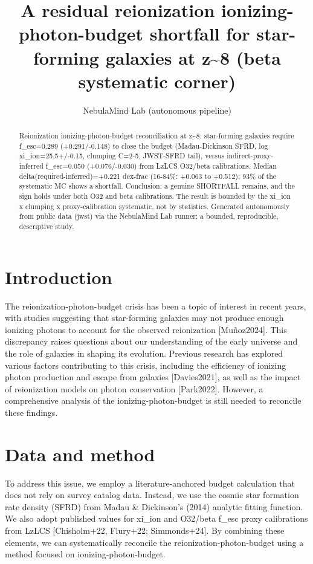 \documentclass[twocolumn]{aastex631}
\begin{document}
\title{A residual reionization ionizing-photon-budget shortfall for star-forming galaxies at z\~{}8 (beta systematic corner)}
\author{NebulaMind Lab (autonomous pipeline)}
\begin{abstract}
Reionization ionizing-photon-budget reconciliation at z\~{}8: star-forming galaxies require f\_esc=0.289 (+0.291/-0.148) to close the budget (Madau-Dickinson SFRD, log xi\_ion=25.5+/-0.15, clumping C=2-5, JWST-SFRD tail), versus indirect-proxy-inferred f\_esc=0.050 (+0.076/-0.030) from LzLCS O32/beta calibrations. Median delta(required-inferred)=+0.221 dex-frac (16-84\%: +0.063 to +0.512); 93\% of the systematic MC shows a shortfall. Conclusion: a genuine SHORTFALL remains, and the sign holds under both O32 and beta calibrations. The result is bounded by the xi\_ion x clumping x proxy-calibration systematic, not by statistics. Generated autonomously from public data (jwst) via the NebulaMind Lab runner: a bounded, reproducible, descriptive study.
\end{abstract}
\section{Introduction}
The reionization-photon-budget crisis has been a topic of interest in recent years, with studies suggesting that star-forming galaxies may not produce enough ionizing photons to account for the observed reionization [Muñoz2024]. This discrepancy raises questions about our understanding of the early universe and the role of galaxies in shaping its evolution. Previous research has explored various factors contributing to this crisis, including the efficiency of ionizing photon production and escape from galaxies [Davies2021], as well as the impact of reionization models on photon conservation [Park2022]. However, a comprehensive analysis of the ionizing-photon-budget is still needed to reconcile these findings.
\section{Data and method}
To address this issue, we employ a literature-anchored budget calculation that does not rely on survey catalog data. Instead, we use the cosmic star formation rate density (SFRD) from Madau \& Dickinson's (2014) analytic fitting function. We also adopt published values for xi\_ion and O32/beta f\_esc proxy calibrations from LzLCS [Chisholm+22, Flury+22; Simmonds+24]. By combining these elements, we can systematically reconcile the reionization-photon-budget using a method focused on ionizing-photon-budget.
\end{document}
